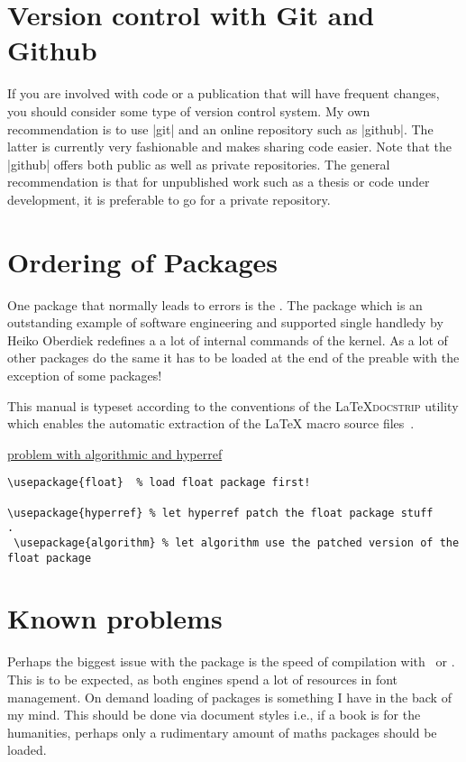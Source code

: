  \section{Version control with Git and Github}
 
 If you are involved with code or a publication that will have frequent changes, you should consider
 some type of version control system. My own recommendation is to use |git| and an online repository such
 as |github|. The latter is currently very fashionable and makes sharing code easier. Note that the |github|
 offers both public as well as private repositories. The general recommendation is that for unpublished work
 such as a thesis or code under development, it is preferable to go for a private repository. 
 

 \section{Ordering of Packages}
 
One package that normally leads to errors is the 
. The package which is an outstanding example of software engineering and supported single handledy by Heiko Oberdiek \citeyearpar{hyperref} redefines a a lot of internal commands of the kernel. As a lot of other packages do the same it has to be loaded at the end of the preable with the exception of some packages! 
 
 This manual is typeset according to the conventions of the
 \LaTeX \textsc{docstrip} utility which enables the automatic
 extraction of the \LaTeX{} macro source files~\cite{GOOSSENS94}.

 
 \href{http://tex.stackexchange.com/questions/96350/problem-with-algorithmic-and-hyperref}{problem with algorithmic and hyperref}

 \begin{verbatim}
\usepackage{float}  % load float package first!

\usepackage{hyperref} % let hyperref patch the float package stuff
.
 \usepackage{algorithm} % let algorithm use the patched version of the float package
 \end{verbatim}
 

\section{Known problems}

Perhaps the biggest issue with the package is the speed of
compilation with \XeLaTeX\ or \LuaTeX. This is to be expected, as both engines spend a lot of resources in font management. On demand loading of packages is something I have in the back of my mind. This should be done via document styles i.e., if a book is for the humanities, perhaps only a rudimentary amount of maths packages should be loaded.

